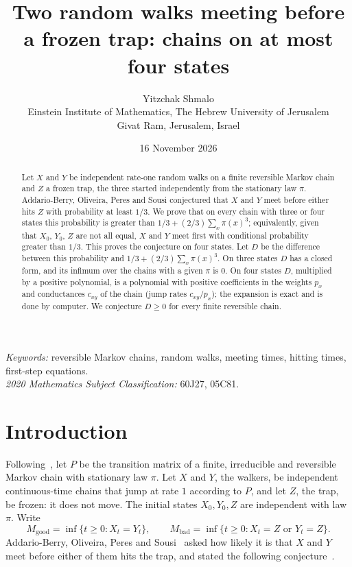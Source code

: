 \documentclass[11pt,a4paper]{article}
\title{Two random walks meeting before a frozen trap: chains on at most four states}
\author{Yitzchak Shmalo\\[0.4em]
\small Einstein Institute of Mathematics, The Hebrew University of Jerusalem\\
\small Givat Ram, Jerusalem, Israel}
\date{16 November 2026}
\numberwithin{equation}{section}
\theoremstyle{remark}
\newcommand{\good}{M_{\mathrm{good}}}
\newcommand{\bad}{M_{\mathrm{bad}}}
\begin{document}
\maketitle
\thispagestyle{fancy}

\begin{abstract}
Let $X$ and $Y$ be independent rate-one random walks on a finite reversible Markov chain and $Z$ a frozen trap, the three started independently from the stationary law $\pi$. Addario-Berry, Oliveira, Peres and Sousi conjectured that $X$ and $Y$ meet before either hits $Z$ with probability at least $1/3$. We prove that on every chain with three or four states this probability is greater than $1/3+(2/3)\sum_x\pi(x)^3$; equivalently, given that $X_0$, $Y_0$, $Z$ are not all equal, $X$ and $Y$ meet first with conditional probability greater than $1/3$. This proves the conjecture on four states. Let $D$ be the difference between this probability and $1/3+(2/3)\sum_x\pi(x)^3$. On three states $D$ has a closed form, and its infimum over the chains with a given $\pi$ is $0$. On four states $D$, multiplied by a positive polynomial, is a polynomial with positive coefficients in the weights $p_x$ and conductances $c_{xy}$ of the chain (jump rates $c_{xy}/p_x$); the expansion is exact and is done by computer. We conjecture $D\ge0$ for every finite reversible chain.
\end{abstract}

\noindent\textit{Keywords:} reversible Markov chains, random walks, meeting times, hitting times, first-step equations.\\
\textit{2020 Mathematics Subject Classification:} 60J27, 05C81.

\section{Introduction}\label{sec:intro}

Following~\cite{ABOPS}, let $P$ be the transition matrix of a finite, irreducible and reversible Markov chain with stationary law $\pi$. Let $X$ and $Y$, the walkers, be independent continuous-time chains that jump at rate $1$ according to $P$, and let $Z$, the trap, be frozen: it does not move. The initial states $X_0,Y_0,Z$ are independent with law $\pi$. Write
\[
\good=\inf\{t\ge0:X_t=Y_t\},\qquad \bad=\inf\{t\ge0:X_t=Z \text{ or } Y_t=Z\}.
\]
Addario-Berry, Oliveira, Peres and Sousi~\cite{ABOPS} asked how likely it is that $X$ and $Y$ meet before either of them hits the trap, and stated the following conjecture~\cite[Conjecture~1.5]{ABOPS}.
\end{document}
